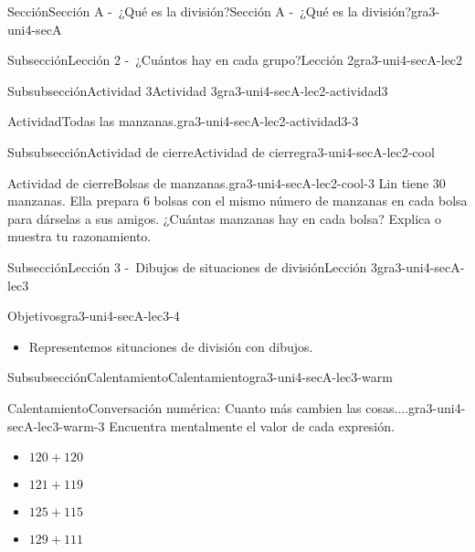 \documentclass[twoside,14pt,]{extarticle}
\begin{document}
\begin{sectionptx}{Sección}{Sección A -~¿Qué es la división?}{}{Sección A -~¿Qué es la división?}{}{}{gra3-uni4-secA}
\begin{subsectionptx}{Subsección}{Lección 2 -~¿Cuántos hay en cada grupo?}{}{Lección 2}{}{}{gra3-uni4-secA-lec2}
\begin{subsubsectionptx}{Subsubsección}{Actividad 3}{}{Actividad 3}{}{}{gra3-uni4-secA-lec2-actividad3}
\begin{activity}{Actividad}{Todas las manzanas.}{gra3-uni4-secA-lec2-actividad3-3}
\begin{itemize}[label=\textbullet]
\end{itemize}
%
\end{activity}%
\end{subsubsectionptx}
%
%
\typeout{************************************************}
\typeout{************************************************}
%
\begin{subsubsectionptx}{Subsubsección}{Actividad de cierre}{}{Actividad de cierre}{}{}{gra3-uni4-secA-lec2-cool}
\begin{project}{Actividad de cierre}{Bolsas de manzanas.}{gra3-uni4-secA-lec2-cool-3}%
Lin tiene 30 manzanas. Ella prepara 6 bolsas con el mismo número de manzanas en cada bolsa para dárselas a sus amigos. ¿Cuántas manzanas hay en cada bolsa? Explica o muestra tu razonamiento.%
\end{project}%
\end{subsubsectionptx}
\end{subsectionptx}
%
%
\typeout{************************************************}
\typeout{************************************************}
%
\begin{subsectionptx}{Subsección}{Lección 3 -~Dibujos de situaciones de división}{}{Lección 3}{}{}{gra3-uni4-secA-lec3}
\begin{objectives}{Objetivos}{gra3-uni4-secA-lec3-4}
%
\begin{itemize}[label=\textbullet]
\item{}Representemos situaciones de división con dibujos.%
\end{itemize}
\end{objectives}
%
%
\typeout{************************************************}
\typeout{************************************************}
%
\begin{subsubsectionptx}{Subsubsección}{Calentamiento}{}{Calentamiento}{}{}{gra3-uni4-secA-lec3-warm}
\begin{exploration}{Calentamiento}{Conversación numérica: Cuanto más cambien las cosas....}{gra3-uni4-secA-lec3-warm-3}%
Encuentra mentalmente el valor de cada expresión.%
\par
%
\begin{itemize}[label=\textbullet]
\item{}\(\displaystyle 120 + 120\)%
\item{}\(\displaystyle 121 + 119\)%
\item{}\(\displaystyle 125 + 115\)%
\item{}\(\displaystyle 129 + 111\)%

\end{itemize}
\end{exploration}
\end{subsubsectionptx}
\end{subsectionptx}
\end{sectionptx}
\end{document}
